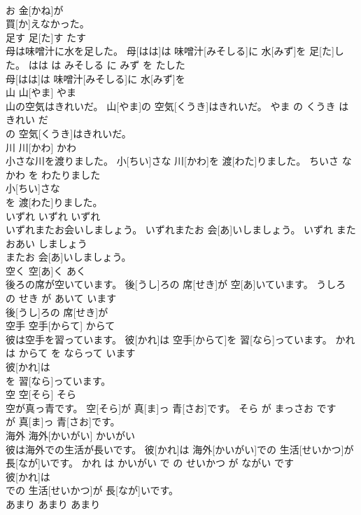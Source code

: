 \documentclass[8pt]{extreport}
\begin{document}
\begin{CJK}{UTF8}{min}
\\	お 金[かね]が
\\	買[か]えなかった。			
\\	足す	足[た]す	たす	
\\	母は味噌汁に水を足した。	母[はは]は 味噌汁[みそしる]に 水[みず]を 足[た]した。	はは は みそしる に みず を たした	
\\	母[はは]は 味噌汁[みそしる]に 水[みず]を
\\	山	山[やま]	やま	
\\	山の空気はきれいだ。	山[やま]の 空気[くうき]はきれいだ。	やま の くうき は きれい だ	
\\	の 空気[くうき]はきれいだ。			
\\	川	川[かわ]	かわ	
\\	小さな川を渡りました。	小[ちい]さな 川[かわ]を 渡[わた]りました。	ちいさ な かわ を わたりました	
\\	小[ちい]さな
\\	を 渡[わた]りました。			
\\	いずれ	いずれ	いずれ	
\\	いずれまたお会いしましょう。	いずれまたお 会[あ]いしましょう。	いずれ また おあい しましょう	
\\	またお 会[あ]いしましょう。			
\\	空く	空[あ]く	あく	
\\	後ろの席が空いています。	後[うし]ろの 席[せき]が 空[あ]いています。	うしろ の せき が あいて います	
\\	後[うし]ろの 席[せき]が
\\	空手	空手[からて]	からて	
\\	彼は空手を習っています。	彼[かれ]は 空手[からて]を 習[なら]っています。	かれ は からて を ならって います	
\\	彼[かれ]は
\\	を 習[なら]っています。			
\\	空	空[そら]	そら	
\\	空が真っ青です。	空[そら]が 真[ま]っ 青[さお]です。	そら が まっさお です	
\\	が 真[ま]っ 青[さお]です。			
\\	海外	海外[かいがい]	かいがい	
\\	彼は海外での生活が長いです。	彼[かれ]は 海外[かいがい]での 生活[せいかつ]が 長[なが]いです。	かれ は かいがい で の せいかつ が ながい です	
\\	彼[かれ]は
\\	での 生活[せいかつ]が 長[なが]いです。			
\\	あまり	あまり	あまり	

\end{CJK}
\end{document}
